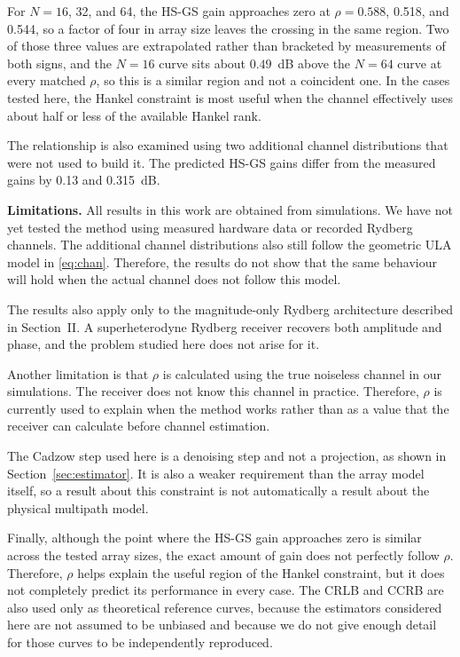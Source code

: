 \documentclass[journal]{IEEEtran}
\begin{document}
For $N=16$, 32, and 64, the HS-GS gain approaches zero at $\rho=0.588$, 0.518,
and 0.544, so a factor of four in array size leaves the crossing in the same
region. Two of those three values are extrapolated rather than bracketed by
measurements of both signs, and the $N=16$ curve sits about $0.49$~dB above the
$N=64$ curve at every matched $\rho$, so this is a similar region and not a
coincident one. In the cases tested here, the Hankel constraint is most useful
when the channel effectively uses about half or less of the available Hankel
rank.

The relationship is also examined using two additional channel distributions
that were not used to build it. The predicted HS-GS gains differ from the
measured gains by 0.13 and 0.315~dB.

\textbf{Limitations.} All results in this work are obtained from simulations.
We have not yet tested the method using measured hardware data or recorded
Rydberg channels. The additional channel distributions also still follow the
geometric ULA model in \eqref{eq:chan}. Therefore, the results do not show that
the same behaviour will hold when the actual channel does not follow this
model.

The results also apply only to the magnitude-only Rydberg architecture
described in Section~II. A superheterodyne Rydberg receiver recovers both
amplitude and phase, and the problem studied here does not arise for it.

Another limitation is that $\rho$ is calculated using the true noiseless
channel in our simulations. The receiver does not know this channel in
practice. Therefore, $\rho$ is currently used to explain when the method works
rather than as a value that the receiver can calculate before channel
estimation.

The Cadzow step used here is a denoising step and not a projection, as shown in
Section~\ref{sec:estimator}. It is also a weaker requirement than the array model itself, so
a result about this constraint is not automatically a result about the physical
multipath model.

Finally, although the point where the HS-GS gain approaches zero is similar
across the tested array sizes, the exact amount of gain does not perfectly
follow $\rho$. Therefore, $\rho$ helps explain the useful region of the Hankel
constraint, but it does not completely predict its performance in every case.
The CRLB and CCRB are also used only as theoretical reference curves, because
the estimators considered here are not assumed to be unbiased and because we do
not give enough detail for those curves to be independently reproduced.
\end{document}
